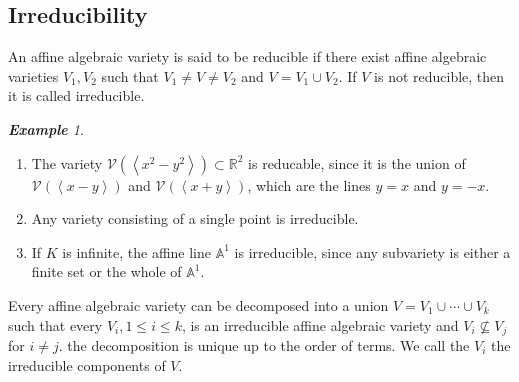 \documentclass[titlepage]{article}
\theoremstyle{remark}
\newtheorem{example}[definition]{\textbf{Example}}
\begin{document}
\subsection{Irreducibility}
  \begin{definition}
    An affine algebraic variety is said to be reducible if there exist affine algebraic varieties $V_1,V_2$ such that $V_1\ne V\ne V_2$ and $V=V_1\cup V_2$. If $V$ is not reducible, then it is called irreducible.
  \end{definition}
  \begin{example}$ $
    \begin{enumerate}
      \item The variety $\mathcal{V}\left(\left\langle x^2-y^2\right\rangle\right)\subset \mathbb{R}^2$ is reducable, since it is the union of $\mathcal{V}\left(\left\langle x-y\right\rangle\right)$ and $\mathcal{V}\left(\left\langle x+y\right\rangle\right)$, which are the lines $y=x$ and $y=-x$.
      \item Any variety consisting of a single point is irreducible.
      \item If $K$ is infinite, the affine line $\mathbb{A}^1$ is irreducible, since any subvariety is either a finite set or the whole of $\mathbb{A}^1$.
    \end{enumerate}
  \end{example}
  \begin{theorem}
    Every affine algebraic variety can be decomposed into a union $V=V_1\cup\cdots\cup V_k$ such that every $V_i,1\le i\le k$, is an irreducible affine algebraic variety and $V_i\not\subseteq V_j$ for $i\ne j$. the decomposition is unique up to the order of terms. We call the $V_i$ the irreducible components of $V$. 
  \end{theorem}
\end{document}
